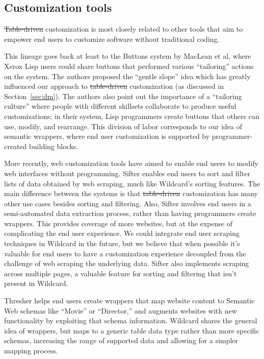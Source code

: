 \documentclass[sigplan,screen,10pt,anonymous,review]{acmart}
\providecommand{\DIFadd}[1]{{\protect\color{blue}\uwave{#1}}} %
\providecommand{\DIFdel}[1]{{\protect\color{red}\sout{#1}}}                      %
\providecommand{\DIFaddbegin}{} %
\providecommand{\DIFaddend}{} %
\providecommand{\DIFdelbegin}{} %
\providecommand{\DIFdelend}{} %
\begin{document}
\hypertarget{customization-tools}{%
\subsection{Customization tools}\label{customization-tools}}

\DIFdelbegin \DIFdel{Table-driven }\DIFdelend \DIFaddbegin \DIFadd{Data-driven }\DIFaddend customization is most closely related to other tools that
aim to empower end users to customize software without traditional
coding.

This lineage goes back at least to the Buttons system by MacLean et
al\DIFaddbegin \DIFadd{.~}\DIFaddend \citep{maclean1990}, where Xerox Lisp users could share buttons that
performed various ``tailoring'' actions on the system. The authors
proposed the ``gentle slope'' idea which has greatly influenced our
approach to \DIFdelbegin \DIFdel{table-driven }\DIFdelend \DIFaddbegin \DIFadd{data-driven }\DIFaddend customization (as discussed in
Section~\ref{sec:dm}). The authors also point out the importance of a
``tailoring culture'' where people with different skillsets collaborate
to produce useful customizations; in their system, Lisp programmers
create buttons that others can use, modify, and rearrange. This division
of labor corresponds to our idea of semantic wrappers, where end user
customization is supported by programmer-created building blocks.

More recently, web customization tools have aimed to enable end users to
modify web interfaces without programming. Sifter \citep{huynh2006}
enables end users to sort and filter lists of data obtained by web
scraping, much like Wildcard's sorting features. The main difference
between the systems is that \DIFdelbegin \DIFdel{table-driven }\DIFdelend \DIFaddbegin \DIFadd{data-driven }\DIFaddend customization has many other use
cases besides sorting and filtering. Also, Sifter involves end users in
a semi-automated data extraction process, rather than having programmers
create wrappers. This provides coverage of more websites, but at the
expense of complicating the end user experience. We could integrate end
user scraping techniques in Wildcard in the future, but we believe that
when possible it's valuable for end users to have a customization
experience decoupled from the challenge of web scraping the underlying
data. Sifter also implements scraping across multiple pages, a valuable
feature for sorting and filtering that isn't present in Wildcard.

Thresher \citep{hogue2005} helps end users create wrappers that map
website content to Semantic Web schemas like ``Movie'' or ``Director,''
and augments websites with new functionality by exploiting that schema
information. Wildcard shares the general idea of wrappers, but maps to a
generic table data type rather than more specific schemas, increasing
the range of supported data and allowing for a simpler mapping process.
\end{document}
